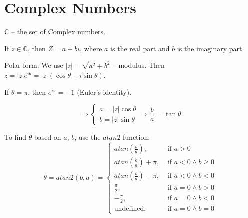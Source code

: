 \documentclass[twoside]{article}
\begin{document}

\section{Complex Numbers} 

$\mathbb{C}$ -- the set of Complex numbers. 

If $z\in \mathbb{C}$, then $Z = a+b i $, where $a$ is the real part and $b$ is the imaginary part.

\underline{Polar form}: We use $|z| = \sqrt{a^2+b^2}$ -- modulus. Then $z = |z|e^{i \theta} = |z|({\cos \theta + i \sin \theta})$.

If $\theta = \pi$, then $e^{i\pi} = -1$ (Euler's identity).

\begin{equation}
    \Longrightarrow
    \begin{cases}
            a = |z| \cos \theta \\
            b = |z| \sin \theta     
    \end{cases}    \Longrightarrow \frac{b}{a} = \tan \theta
\end{equation}

\begin{remark}\label{rem:a}
    To find $\theta$ based on $a$, $b$, use the $atan2$ function:
    \begin{equation}
        \theta = atan2(b,a) = \begin{cases}
            atan(\frac{b}{a}), &\text{ if }a>0\\
            atan(\frac{b}{a})+\pi, &\text{ if }a<0 \wedge b\geq 0\\
            atan(\frac{b}{a})- \pi, &\text{ if }a<0 \wedge b <0\\
            \frac{\pi}{2}, &\text{ if }a=0 \wedge b>0\\
            -\frac{\pi}{2}, &\text{ if }a=0 \wedge b<0\\
            \text{undefined}, &\text{ if }a=0 \wedge b=0   
        \end{cases}
    \end{equation}
\end{remark}
\end{document}
